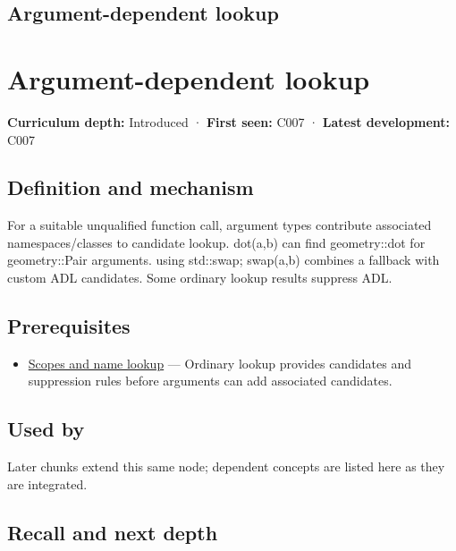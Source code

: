 \hypertarget{appendix-7863714aa97f}{}
\section*{Argument-dependent lookup}
\chapter{Argument-dependent lookup}\label{appendix-7863714aa97f-argument-dependent-lookup}

\textbf{Curriculum depth:} Introduced · \textbf{First seen:} C007 · \textbf{Latest development:} C007

\section{Definition and mechanism}\label{appendix-7863714aa97f-definition-and-mechanism}

For a suitable unqualified function call, argument types contribute associated namespaces/classes to candidate lookup. dot(a,b) can find geometry::dot for geometry::Pair arguments. using std::swap; swap(a,b) combines a fallback with custom ADL candidates. Some ordinary lookup results suppress ADL.

\section{Prerequisites}\label{appendix-7863714aa97f-prerequisites}

\begin{itemize}
\tightlist
\item
  \hyperref[appendix-b12b31759da1]{Scopes and name lookup} --- Ordinary lookup provides candidates and suppression rules before arguments can add associated candidates.
\end{itemize}

\section{Used by}\label{appendix-7863714aa97f-used-by}

Later chunks extend this same node; dependent concepts are listed here as they are integrated.

\section{Recall and next depth}\label{appendix-7863714aa97f-recall-and-next-depth}

